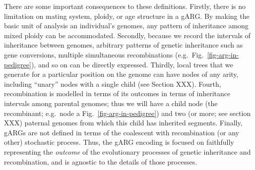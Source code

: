 \documentclass{article}
\newcommand{\noderef}[1]{\textsf{#1}}
\begin{document}
There are some important consequences to these definitions.
Firstly, there is
no limitation on mating system, ploidy, or age structure in a gARG.
By making the
basic unit of analysis an individual's genomes,
any pattern of inheritance among mixed ploidy can be accommodated.
Secondly, because we record the intervals of inheritance
between genomes,
arbitrary patterns of genetic inheritance such as
gene conversions,
multiple simultaneous recombinations
(e.g.\ Fig.~\ref{fig-arg-in-pedigree}),
and so on can be directly expressed.
Thirdly, local trees that we generate for a particular position on the
genome can have nodes of any arity, including ``unary''
nodes with a single child (see Section XXX).
Fourth, recombination is modelled in terms of
its outcomes in terms of inheritance intervals among parental genomes;
thus we will have a child node (the recombinant; e.g.\ node \noderef{a}
Fig.~\ref{fig-arg-in-pedigree}) and two (or more; see section XXX)
paternal genomes from which this child has inherited segments.
Finally, gARGs are not defined in terms of the
coalescent with recombination (or any other) stochastic process.
Thus, the gARG encoding is focused on faithfully representing the
\emph{outcome} of the evolutionary processes of genetic inheritance and
recombination, and is agnostic to the details of those processes.
\end{document}

